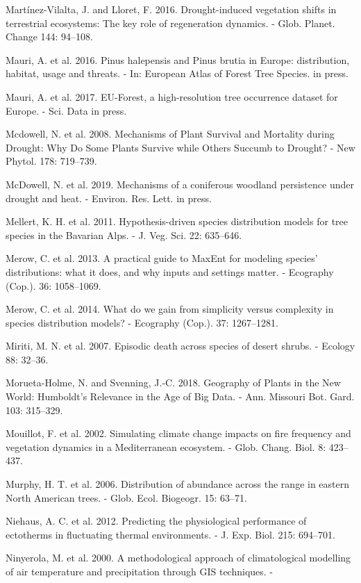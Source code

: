 \documentclass[11pt,twoside]{reedthesis}
\begin{document}
Martínez-Vilalta, J. and Lloret, F. 2016. Drought-induced vegetation
shifts in terrestrial ecosystems: The key role of regeneration dynamics.
- Glob. Planet. Change 144: 94--108.\par
Mauri, A. et al. 2016. Pinus halepensis and Pinus brutia in Europe:
distribution, habitat, usage and threats. - In: European Atlas of Forest
Tree Species. in press.\par
Mauri, A. et al. 2017. EU-Forest, a high-resolution tree occurrence
dataset for Europe. - Sci. Data in press.\par
Mcdowell, N. et al. 2008. Mechanisms of Plant Survival and Mortality
during Drought: Why Do Some Plants Survive while Others Succumb to
Drought? - New Phytol. 178: 719--739.\par
McDowell, N. et al. 2019. Mechanisms of a coniferous woodland
persistence under drought and heat. - Environ. Res. Lett. in press.\par
Mellert, K. H. et al. 2011. Hypothesis-driven species distribution
models for tree species in the Bavarian Alps. - J. Veg. Sci. 22:
635--646.\par
Merow, C. et al. 2013. A practical guide to MaxEnt for modeling species'
distributions: what it does, and why inputs and settings matter. -
Ecography (Cop.). 36: 1058--1069.\par
Merow, C. et al. 2014. What do we gain from simplicity versus complexity
in species distribution models? - Ecography (Cop.). 37: 1267--1281.\par
Miriti, M. N. et al. 2007. Episodic death across species of desert
shrubs. - Ecology 88: 32--36.\par
Morueta-Holme, N. and Svenning, J.-C. 2018. Geography of Plants in the
New World: Humboldt's Relevance in the Age of Big Data. - Ann. Missouri
Bot. Gard. 103: 315--329.\par
Mouillot, F. et al. 2002. Simulating climate change impacts on fire
frequency and vegetation dynamics in a Mediterranean ecosystem. - Glob.
Chang. Biol. 8: 423--437.\par
Murphy, H. T. et al. 2006. Distribution of abundance across the range in
eastern North American trees. - Glob. Ecol. Biogeogr. 15: 63--71.\par
Niehaus, A. C. et al. 2012. Predicting the physiological performance of
ectotherms in fluctuating thermal environments. - J. Exp. Biol. 215:
694--701.\par
Ninyerola, M. et al. 2000. A methodological approach of climatological
modelling of air temperature and precipitation through GIS techniques. -
\end{document}
